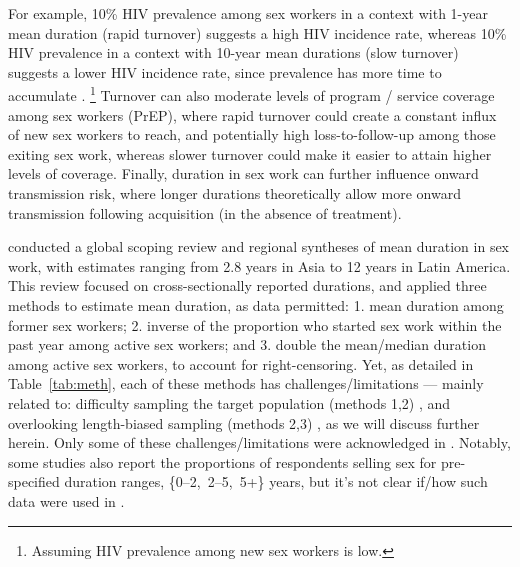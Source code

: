 For example, 10\% HIV prevalence among sex workers
in a context with 1-year mean duration (rapid turnover)
suggests a high HIV incidence rate, whereas 10\% HIV prevalence
in a context with 10-year mean durations (slow turnover)
suggests a lower HIV incidence rate,
since prevalence has more time to accumulate \cite{Knight2020,Anderegg2024}.%
\footnote{Assuming HIV prevalence among new sex workers is low.}
Turnover can also moderate levels of
program / service coverage among sex workers (\eg PrEP),
where rapid turnover could create a constant influx of new sex workers to reach, and
potentially high loss-to-follow-up among those exiting sex work,
whereas slower turnover could make it easier to attain higher levels of coverage.
Finally, duration in sex work can further influence onward transmission risk,
where longer durations theoretically allow
more onward transmission following acquisition (in the absence of treatment).
\par
\citet{Fazito2012} conducted
a global scoping review and regional syntheses of mean duration in sex work,
with estimates ranging from 2.8 years in Asia to 12 years in Latin America.
This review focused on cross-sectionally reported durations,
and applied three methods to estimate mean duration, as data permitted:
1. mean duration among former sex workers;
2. inverse of the proportion who started sex work within the past year among active sex workers; and
3. double the mean/median duration among active sex workers, to account for right-censoring.
Yet, as detailed in Table~\ref{tab:meth},
each of these methods has challenges/limitations --- mainly related to:
difficulty sampling the target population (methods 1,2) \cite{Ward2006}, and
overlooking length-biased sampling (methods 2,3) \cite{Kafadar2009},
as we will discuss further herein.
Only some of these challenges/limitations were acknowledged in \cite{Fazito2012}.
Notably, some studies also report the proportions of respondents
selling sex for pre-specified duration ranges, \eg \mbox{\{0--2, 2--5, 5+\}} years,
but it's not clear if/how such data were used in \cite{Fazito2012}.
